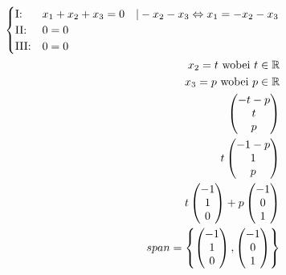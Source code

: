 \begin{align*}
    \begin{cases}
        \text{I:\@} & x_1 + x_2 + x_3 = 0 \quad | -x_2 - x_3 \Leftrightarrow x_1 = -x_2 - x_3 \\
        \text{II:\@} & 0 = 0 \\
        \text{III:\@} & 0 = 0
    \end{cases} \\
    x_2 = t \text{ wobei } t \in \mathbb{R} \\
    x_3 = p \text{ wobei } p \in \mathbb{R} \\
    \begin{pmatrix}
        -t -p \\ t \\ p
    \end{pmatrix} \\
    t \begin{pmatrix}
        -1 -p \\ 1 \\ p
    \end{pmatrix} \\
    t \begin{pmatrix}
        -1 \\ 1 \\ 0
    \end{pmatrix} + p \begin{pmatrix}
        -1 \\ 0 \\ 1
    \end{pmatrix} \\ 
    span = \left\{\begin{pmatrix}
        -1 \\ 1 \\ 0
    \end{pmatrix}, \begin{pmatrix}
        -1 \\ 0 \\ 1
    \end{pmatrix}\right\}
\end{align*}

